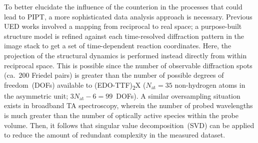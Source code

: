 To better elucidate the influence of the counterion in the processes that could lead to PIPT,
a more sophisticated data analysis approach is necessary.
Previous UED works involved a mapping from reciprocal to real space;
a purpose-built structure model is refined against each time-resolved diffraction pattern
in the image stack to get a set of time-dependent reaction coordinates.
Here, the projection of the structural dynamics is performed instead
directly from within reciprocal space.
%
This is possible since the number of observable diffraction spots (ca.~$200$ Friedel pairs)
is greater than the number of possible degrees of freedom~(DOFs) available to (EDO-TTF)\textsubscript{2}X
($N_\text{at} = 35$ non-hydrogen atoms in the asymmetric unit; $3 N_\text{at} - 6 = 99$~DOFs).
A similar oversampling situation exists in broadband TA spectroscopy,
wherein the number of probed wavelengths is much greater than
the number of optically active species within the probe volume.
%
Then, it follows that singular value decomposition~(SVD) can be applied
to reduce the amount of redundant complexity in the measured dataset.

